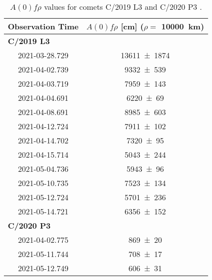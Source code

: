 \begin{table}
    \centering
    \caption{$A(0)f\rho$ values for comets C/2019 L3  and C/2020 P3 . }\label{tab:afrho}
    \begin{threeparttable}
        \begin{tabular}{cc}
            \toprule
            Observation Time & $A(0)f\rho$ [\unit{\cm}] ($\rho =$ \qty{10000}{\km}) \\
            \midrule
            \multicolumn{2}{l}{\textbf{C/2019 L3}} \\
            2021-03-28.729 & \num{13611 +- 1874} \\
            2021-04-02.739 & \num{9332 +- 539} \\
            2021-04-03.719 & \num{7959 +- 143} \\
            2021-04-04.691 & \num{6220 +- 69} \\
            2021-04-08.691 & \num{8985 +- 603} \\
            2021-04-12.724 & \num{7911 +- 102} \\
            2021-04-14.702 & \num{7320 +- 95} \\
            2021-04-15.714 & \num{5043 +- 244} \\
            2021-05-04.736 & \num{5943 +- 96} \\
            2021-05-10.735 & \num{7523 +- 134} \\
            2021-05-12.724 & \num{5701 +- 236} \\
            2021-05-14.721 & \num{6356 +- 152} \\
            \multicolumn{2}{l}{\textbf{C/2020 P3}} \\
            2021-04-02.775 & \num{869 +- 20} \\
            2021-05-11.744 & \num{708 +- 17} \\
            2021-05-12.749 & \num{606 +- 31} \\
            \bottomrule
        \end{tabular}
    \end{threeparttable}
\end{table}
